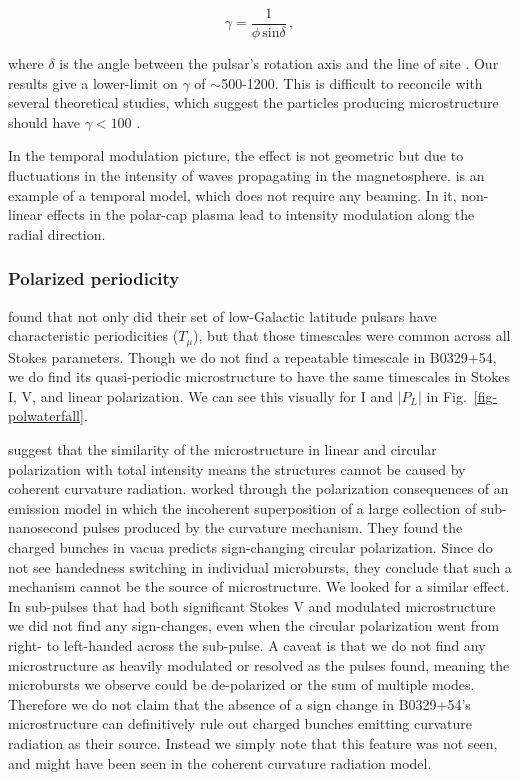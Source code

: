 \begin{equation}
\gamma = \frac{1}{\phi\, \textrm{sin}\delta}\,,
\end{equation}

\noindent where $\delta$ is the angle between 
the pulsar's rotation axis and the line of site \citep{1998A&A...332..111L}.
Our results give a lower-limit on $\gamma$ of 
$\sim$500-1200. This is difficult to reconcile 
with several theoretical studies, which suggest 
the particles producing microstructure should have
$\gamma<100$ \citep{1992msem.coll..322A, 1998A&A...332..111L}.

In the temporal modulation picture, the effect
is not geometric but due to fluctuations in 
the intensity of waves propagating in the magnetosphere.
\citet{1983Ap&SS..97....9C} is an example of a temporal model, which 
does not require any beaming. In it, non-linear effects 
in the polar-cap plasma lead to intensity modulation 
along the radial direction.

\subsubsection{Polarized periodicity}

\citet{2015ApJ...806..236M} found that not only did 
their set of low-Galactic latitude pulsars 
have characteristic periodicities ($T_\mu$), but that 
those timescales were common across all Stokes 
parameters. Though we do not find a repeatable 
timescale in B0329+54, we do find its 
quasi-periodic microstructure to have the same 
timescales in Stokes I, V, and linear polarization.
We can see this visually 
for I and $|P_L|$ in Fig.~\ref{fig-polwaterfall}.

\citet{2015ApJ...806..236M} suggest that the similarity of 
the microstructure in 
linear and circular polarization with total intensity 
means the structures cannot be 
caused by coherent curvature radiation. 
\citet{1990A&A...234..269G} worked through the 
polarization consequences of an emission model 
in which the incoherent superposition of a large 
collection of sub-nanosecond pulses produced 
by the curvature mechanism.
They found the charged bunches in vacua predicts
sign-changing circular polarization. Since 
\citet{2015ApJ...806..236M} do not see 
handedness switching in individual microbursts, they conclude 
that such a mechanism cannot be the source of microstructure.  
We looked for a similar effect. In sub-pulses that had both significant 
Stokes V and modulated microstructure we did not find any sign-changes, 
even when the circular polarization went from right- to left-handed
across the sub-pulse. A caveat is that we do not find any 
microstructure as heavily modulated or resolved as the pulses 
\citet{2015ApJ...806..236M} found, meaning the microbursts 
we observe could be de-polarized or the sum of multiple 
modes. Therefore we do not claim that the 
absence of a sign change in B0329+54's microstructure 
can definitively rule out charged bunches emitting 
curvature radiation as their source. Instead we simply note 
that this feature was not seen, and might have been seen 
in the coherent curvature radiation model.





